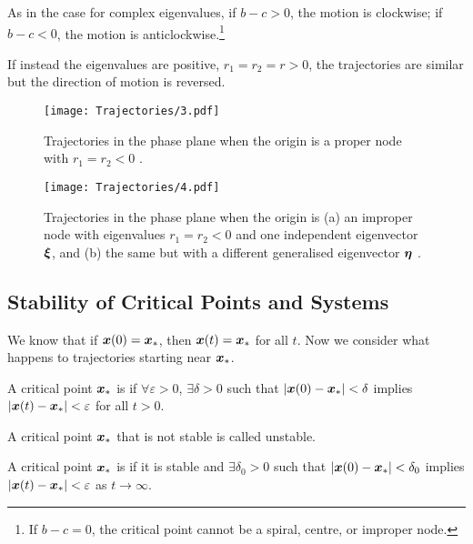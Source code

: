 \begin{itemize}
\begin{enumerate}[label=(\roman*)]
		As in the case for complex eigenvalues, if $b-c>0$, the motion is clockwise; if $b-c<0$, the motion is anticlockwise.\footnote{If $b-c=0$, the critical point cannot be a spiral, centre, or improper node.}
	\end{enumerate}
	If instead the eigenvalues are positive, $r_1 = r_2 = r > 0$, the trajectories are similar but the direction of motion is reversed.
\end{itemize}

\begin{figure}[h!]
	\centering
	\texttt{[image: Trajectories/3.pdf]}
	\caption{Trajectories in the phase plane when the origin is a proper node with $r_1 = r_2 < 0$ \cite[Figure 9.1.3(a)]{boyce}.}
	\label{fig:trajectory3}
\end{figure}

\begin{figure}[h!]
	\centering
	\texttt{[image: Trajectories/4.pdf]}
	\caption{Trajectories in the phase plane when the origin is (a) an improper node with eigenvalues $r_1 = r_2 < 0$ and one independent eigenvector $\bm{\xi}$, and (b) the same but with a different generalised eigenvector $\bm{\eta}$ \cite[Figure 9.1.4]{boyce}.}
	\label{fig:trajectory4}
\end{figure}

\subsection{Stability of Critical Points and Systems}

We know that if $\bm{x}(0) = \bm{x}_{\ast}$, then $\bm{x}(t) = \bm{x}_{\ast}$ for all $t$. Now we consider what happens to trajectories starting near $\bm{x}_{\ast}$.

\begin{definition}
	A critical point $\bm{x}_{\ast}$ is  if $\forall \varepsilon>0$, $\exists \delta>0$ such that $|\bm{x}(0) - \bm{x}_{\ast}| < \delta$ implies $|\bm{x}(t) - \bm{x}_{\ast}|<\varepsilon$ for all $t>0$.
\end{definition}

\begin{definition}
	A critical point $\bm{x}_{\ast}$ that is not stable is called unstable.
\end{definition}

\begin{definition}
	A critical point $\bm{x}_{\ast}$ is  if it is stable and $\exists \delta_0 >0$ such that $|\bm{x}(0) - \bm{x}_{\ast}| < \delta_0$ implies $|\bm{x}(t) - \bm{x}_{\ast}|<\varepsilon$ as $t \to \infty$.
\end{definition}

